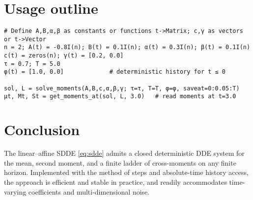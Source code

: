 \documentclass[11pt]{article}
\begin{document}

\section{Usage outline}
\begin{lstlisting}
# Define A,B,α,β as constants or functions t->Matrix; c,γ as vectors or t->Vector
n = 2; A(t) = -0.8I(n); B(t) = 0.1I(n); α(t) = 0.3I(n); β(t) = 0.1I(n)
c(t) = zeros(n); γ(t) = [0.2, 0.0]
τ = 0.7; T = 5.0
φ(t) = [1.0, 0.0]             # deterministic history for t ≤ 0

sol, L = solve_moments(A,B,c,α,β,γ; τ=τ, T=T, φ=φ, saveat=0:0.05:T)
μt, Mt, St = get_moments_at(sol, L, 3.0)   # read moments at t=3.0
\end{lstlisting}

\section{Conclusion}
The linear--affine SDDE \eqref{eq:sdde} admits a closed deterministic DDE system for the mean, second moment, and a finite ladder of cross-moments on any finite horizon. Implemented with the method of steps and absolute-time history access, the approach is efficient and stable in practice, and readily accommodates time-varying coefficients and multi-dimensional noise.
\end{document}

